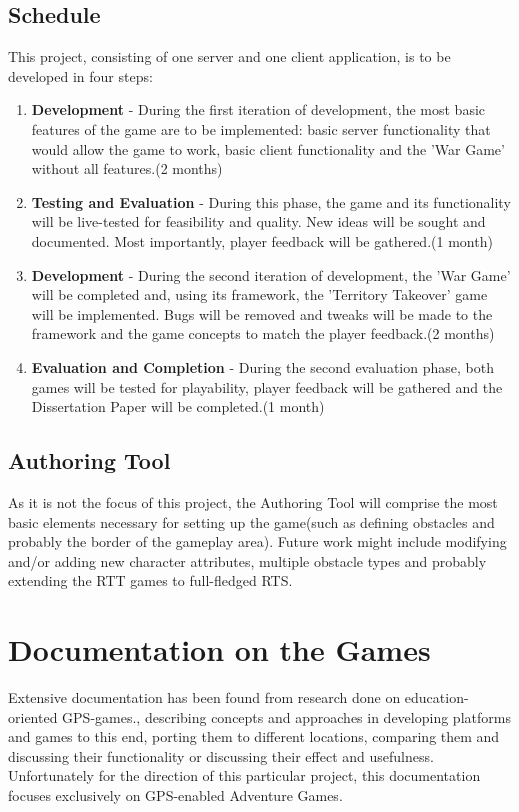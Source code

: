 \documentclass{article}
\begin{document}
\subsection{Schedule}
This project, consisting of one server and one client application, is to be
developed in four steps: 
\begin{enumerate}
  \item \textbf{Development} - During the first iteration of development, the
  most basic features of the game are to be implemented: basic server
  functionality that would allow the game to work, basic client functionality
  and the 'War Game' without all features.(2 months)
  \item \textbf{Testing and Evaluation} - During this phase, the game and its
  functionality will be live-tested for feasibility and quality. New ideas will
  be sought and documented. Most importantly, player feedback will be
  gathered.(1 month)
  \item \textbf{Development} - During the second iteration of development, the
  'War Game' will be completed and, using its framework, the 'Territory
  Takeover' game will be implemented. Bugs will be removed and tweaks will be
  made to the framework and the game concepts to match the player feedback.(2
  months)
  \item \textbf{Evaluation and Completion} -  During the second evaluation
  phase, both games will be tested for playability, player feedback will be
  gathered and the Dissertation Paper will be completed.(1 month)
\end{enumerate}


\subsection{Authoring Tool}
As it is not the focus of this project, the Authoring Tool will comprise the
most basic elements necessary for setting up the game(such as defining obstacles
and probably the border of the gameplay area). Future work might include
modifying and/or adding new character attributes, multiple obstacle types and
probably extending the RTT games to full-fledged RTS.\newline

\section{Documentation on the Games}
Extensive documentation has been found from research done on education-oriented
GPS-games.\cite{pbarg1}\cite{pbarg2}\cite{pbarg3}\cite{pbarg4}\cite{pbarg5}\cite{pbarg6},
describing concepts and approaches in developing platforms and games to this
end\cite{pbarg3}, porting them to different locations\cite{pbarg4}, comparing
them and discussing their functionality\cite{pbarg6}\cite{pbarg1}\cite{pbarg2}
or discussing their effect and usefulness\cite{pbarg1}. Unfortunately for the
direction of this particular project, this documentation focuses exclusively on
GPS-enabled Adventure Games.\newline
\end{document}
